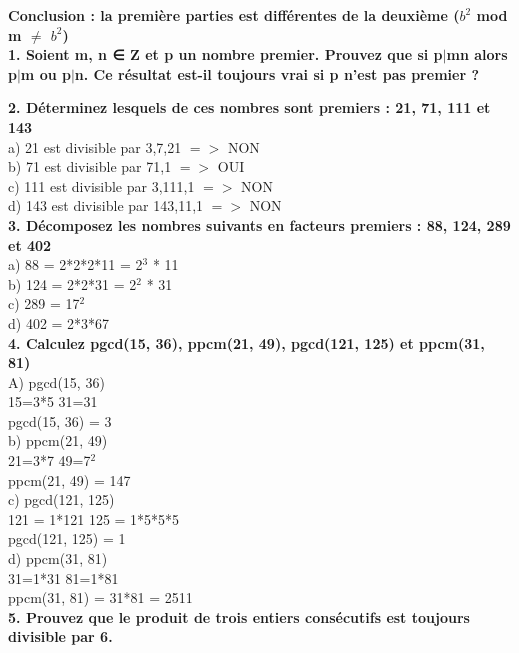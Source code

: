 \textbf{Conclusion : la première parties est différentes de la deuxième ($b^{2}$ mod m $\ne$ $b^{2}$) } \\

\newpage
\textbf{1. Soient m, n ∈ Z et p un nombre premier. Prouvez que si p$|$mn alors p$|$m ou p$|$n. Ce résultat est-il toujours vrai si p n’est pas premier ? }


\textbf{2. Déterminez lesquels de ces nombres sont premiers : 21, 71, 111 et 143} \\

a) 21 est divisible par 3,7,21 $=>$ NON \\
b) 71 est divisible par 71,1 $=>$ OUI  \\
c) 111 est divisible par 3,111,1 $=>$ NON  \\
d) 143 est divisible par 143,11,1 $=>$ NON \\

\textbf{3. Décomposez les nombres suivants en facteurs premiers : 88, 124, 289 et 402} \\

a) 88 = 2*2*2*11 = 2$^{3}$ * 11 \\
b) 124 = 2*2*31 = 2$^{2}$ * 31 \\
c) 289 = 17$^{2}$ \\
d) 402 = 2*3*67 \\

\textbf{4. Calculez pgcd(15, 36), ppcm(21, 49), pgcd(121, 125) et ppcm(31, 81)} \\

A) pgcd(15, 36)\\
15=3*5 31=31 \\
pgcd(15, 36) = 3 \\

b) ppcm(21, 49) \\
21=3*7  49=7$^{2}$ \\
ppcm(21, 49) = 147 \\

c) pgcd(121, 125) \\
121 = 1*121  125 = 1*5*5*5 \\
pgcd(121, 125) = 1 \\

d) ppcm(31, 81) \\
31=1*31 81=1*81 \\
ppcm(31, 81) = 31*81 = 2511 \\


\textbf{5. Prouvez que le produit de trois entiers consécutifs est toujours divisible par 6.} \\

